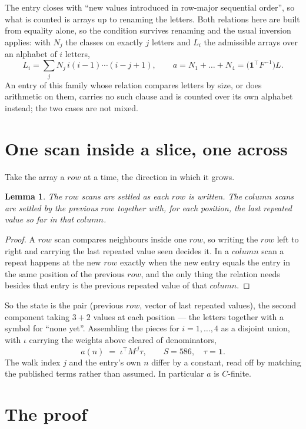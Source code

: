\documentclass[11pt,a4paper]{article}
\theoremstyle{plain}
\newtheorem{lemma}[theorem]{Lemma}
\theoremstyle{definition}
\begin{document}
The entry closes with ``new values introduced in row-major sequential order'', so what is
counted is arrays up to renaming the letters. Both relations here are built from equality
alone, so the condition survives renaming and the usual inversion applies: with $N_j$ the
classes on exactly $j$ letters and $L_i$ the admissible arrays over an alphabet of $i$ letters,
\[
L_i=\sum_j N_j\,i(i-1)\cdots(i-j+1),\qquad
a=N_1+\dots+N_{4}=\bigl(\mathbf{1}^{\!\top}F^{-1}\bigr)L .
\]
An entry of this family whose relation compares letters by size, or does arithmetic on them,
carries no such clause and is counted over its own alphabet instead; the two cases are not
mixed.

\section{One scan inside a slice, one across}

Take the array a $row$ at a time, the direction in which it grows.

\begin{lemma}\label{lem:state}
The $row$ scans are settled as each $row$ is written. The $column$ scans are
settled by the previous $row$ together with, for each position, the last repeated value
so far in that $column$.
\end{lemma}

\begin{proof}
A $row$ scan compares neighbours inside one $row$, so writing the
$row$ left to right and carrying the last repeated value seen decides it. In a
$column$ scan a repeat happens at the new $row$ exactly when the new entry equals the
entry in the same position of the previous $row$, and the only thing the relation needs
besides that entry is the previous repeated value of that $column$.
\end{proof}

So the state is the pair (previous $row$, vector of last repeated values), the second
component taking $3+2$ values at each position --- the letters together with a symbol for
``none yet''. Assembling the pieces for $i=1,\dots,4$ as a disjoint union, with $\iota$ carrying the weights above cleared of denominators,
\[
a(n)\;=\;\iota^{\!\top}M^{\,j}\tau ,\qquad S=586,\quad\tau=\mathbf{1} .
\]
The walk index $j$ and the entry's own $n$ differ by a constant, read off by matching the
published terms rather than assumed. In particular $a$ is $C$-finite.

\section{The proof}
\end{document}

